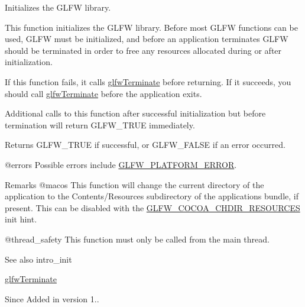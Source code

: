 Initializes the G\+L\+FW library. 

This function initializes the G\+L\+FW library. Before most G\+L\+FW functions can be used, G\+L\+FW must be initialized, and before an application terminates G\+L\+FW should be terminated in order to free any resources allocated during or after initialization.

If this function fails, it calls \mbox{\hyperlink{group__init_gafd90e6fd4819ea9e22e5e739519a6504}{glfw\+Terminate}} before returning. If it succeeds, you should call \mbox{\hyperlink{group__init_gafd90e6fd4819ea9e22e5e739519a6504}{glfw\+Terminate}} before the application exits.

Additional calls to this function after successful initialization but before termination will return {\ttfamily G\+L\+F\+W\+\_\+\+T\+R\+UE} immediately.

\begin{DoxyReturn}{Returns}
{\ttfamily G\+L\+F\+W\+\_\+\+T\+R\+UE} if successful, or {\ttfamily G\+L\+F\+W\+\_\+\+F\+A\+L\+SE} if an error occurred.
\end{DoxyReturn}
@errors Possible errors include \mbox{\hyperlink{group__errors_gad44162d78100ea5e87cdd38426b8c7a1}{G\+L\+F\+W\+\_\+\+P\+L\+A\+T\+F\+O\+R\+M\+\_\+\+E\+R\+R\+OR}}.

\begin{DoxyRemark}{Remarks}
@macos This function will change the current directory of the application to the {\ttfamily Contents/\+Resources} subdirectory of the application\textquotesingle{}s bundle, if present. This can be disabled with the \mbox{\hyperlink{group__init_gab937983147a3158d45f88fad7129d9f2}{G\+L\+F\+W\+\_\+\+C\+O\+C\+O\+A\+\_\+\+C\+H\+D\+I\+R\+\_\+\+R\+E\+S\+O\+U\+R\+C\+ES}} init hint.
\end{DoxyRemark}
@thread\+\_\+safety This function must only be called from the main thread.

\begin{DoxySeeAlso}{See also}
intro\+\_\+init 

\mbox{\hyperlink{group__init_gafd90e6fd4819ea9e22e5e739519a6504}{glfw\+Terminate}}
\end{DoxySeeAlso}
\begin{DoxySince}{Since}
Added in version 1.. 
\end{DoxySince}
\mbox{\label{group__init_gac85e41aab1c2bd6fc740f4377d9e7e9f}} 
